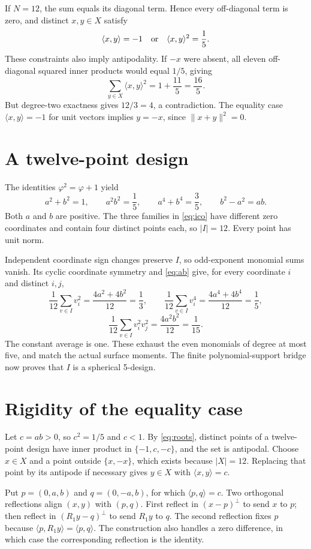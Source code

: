 \documentclass[11pt]{article}
\newcommand{\ip}[2]{\langle #1,#2\rangle}
\begin{document}
If $N=12$, the sum equals its diagonal term. Hence every off-diagonal term is zero, and distinct $x,y\in X$ satisfy
\begin{equation}\label{eq:roots}
 \ip{x}{y}=-1\quad\hbox{or}\quad \ip{x}{y}^2=\frac15.
\end{equation}
These constraints also imply antipodality. If $-x$ were absent, all eleven off-diagonal squared inner products would equal $1/5$, giving
\[
 \sum_{y\in X}\ip{x}{y}^2=1+\frac{11}{5}=\frac{16}{5}.
\]
But degree-two exactness gives $12/3=4$, a contradiction. The equality case $\ip{x}{y}=-1$ for unit vectors implies $y=-x$, since $\|x+y\|^2=0$.

\section{A twelve-point design}
The identities $\varphi^2=\varphi+1$ yield
\begin{equation}\label{eq:ab}
 a^2+b^2=1,\qquad a^2b^2=\frac15,\qquad
 a^4+b^4=\frac35,\qquad b^2-a^2=ab.
\end{equation}
Both $a$ and $b$ are positive. The three families in \eqref{eq:ico} have different zero coordinates and contain four distinct points each, so $|I|=12$. Every point has unit norm.

Independent coordinate sign changes preserve $I$, so odd-exponent monomial sums vanish. Its cyclic coordinate symmetry and \eqref{eq:ab} give, for every coordinate $i$ and distinct $i,j$,
\[
 \frac1{12}\sum_{v\in I}v_i^2=\frac{4a^2+4b^2}{12}=\frac13,
 \qquad
 \frac1{12}\sum_{v\in I}v_i^4=\frac{4a^4+4b^4}{12}=\frac15,
\]
\[
 \frac1{12}\sum_{v\in I}v_i^2v_j^2=\frac{4a^2b^2}{12}=\frac1{15}.
\]
The constant average is one. These exhaust the even monomials of degree at most five, and match the actual surface moments. The finite polynomial-support bridge now proves that $I$ is a spherical 5-design.

\section{Rigidity of the equality case}
Let $c=ab>0$, so $c^2=1/5$ and $c<1$. By \eqref{eq:roots}, distinct points of a twelve-point design have inner product in $\{-1,c,-c\}$, and the set is antipodal. Choose $x\in X$ and a point outside $\{x,-x\}$, which exists because $|X|=12$. Replacing that point by its antipode if necessary gives $y\in X$ with $\ip{x}{y}=c$.

Put $p=(0,a,b)$ and $q=(0,-a,b)$, for which $\ip{p}{q}=c$. Two orthogonal reflections align $(x,y)$ with $(p,q)$. First reflect in $(x-p)^\perp$ to send $x$ to $p$; then reflect in $(R_1y-q)^\perp$ to send $R_1y$ to $q$. The second reflection fixes $p$ because $\ip{p}{R_1y}=\ip{p}{q}$. The construction also handles a zero difference, in which case the corresponding reflection is the identity.
\end{document}
